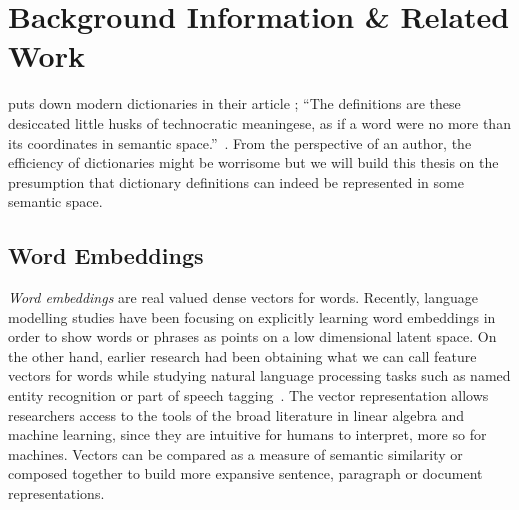 
\chapter{Background Information \& Related Work}%
\label{chap:background_n_related}

\citeauthor{somers_youre_2014} puts down modern dictionaries in their article ;
\enquote{The definitions are these desiccated little husks of technocratic meaningese, as if a word were no more than its coordinates in semantic space.}~\cite{somers_youre_2014}.
From the perspective of an author, the efficiency of dictionaries might be worrisome but we will build this thesis on the presumption that dictionary definitions can indeed be represented in some semantic space.

\section{Word Embeddings}%
\label{sec:word_embeddings}


\emph{Word embeddings} are real valued dense vectors for words.
Recently, language modelling studies have been focusing on explicitly learning word embeddings in order to show words or phrases as points on a low dimensional latent space.
On the other hand, earlier research had been obtaining what we can call feature vectors for words while studying natural language processing tasks such as named entity recognition or part of speech tagging~\cite{almeida_word_2019, collobert_unified_2008}.
The vector representation allows researchers access to the tools of the broad literature in linear algebra and machine learning, since they are intuitive for humans to interpret, more so for machines.
Vectors can be compared as a measure of semantic similarity or composed together to build more expansive sentence, paragraph or document representations.

